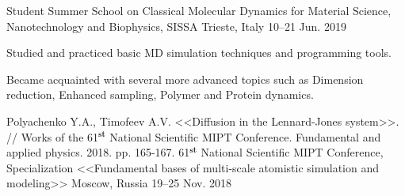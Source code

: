 \begin{cventries}
  \cventry
    {Student} %
    {Summer School on Classical Molecular Dynamics for Material Science, Nanotechnology and Biophysics, SISSA} %
    {Trieste, Italy} %
    {10--21 Jun. 2019} %
    {
      \begin{cvitems} %
        \item {Studied and practiced basic MD simulation techniques and programming tools.}
        \item {Became acquainted with several more advanced topics such as Dimension reduction, Enhanced sampling, Polymer and Protein dynamics.}
      \end{cvitems}
    }
    
    
  \cventry
    {Polyachenko Y.A., Timofeev A.V. <<Diffusion in the Lennard-Jones system>>. // Works of the 61$^{\textbf{st}}$ National Scientific MIPT Conference. Fundamental and applied physics. 2018. pp. 165-167.} %
    {61$^{\textbf{st}}$ National Scientific MIPT Conference, Specialization <<Fundamental bases of multi-scale atomistic simulation and modeling>>} %
    {Moscow, Russia} %
    {19--25 Nov. 2018} %
    {
      \begin{cvitems} %
      \end{cvitems}
    }
    

\end{cventries}
